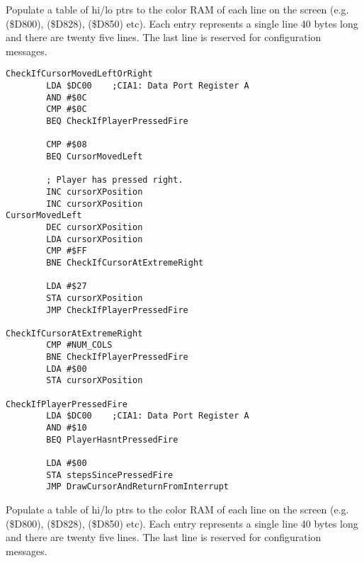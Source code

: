 Populate a table of hi/lo ptrs to the color RAM
of each line on the screen (e.g. \icode(\$D800), \icode(\$D828), \icode(\$D850) etc). Each entry represents a single
line 40 bytes long and there are twenty five lines.
The last line is reserved for configuration messages.



\clearpage
\begin{lstlisting}
CheckIfCursorMovedLeftOrRight   
        LDA $DC00    ;CIA1: Data Port Register A
        AND #$0C
        CMP #$0C
        BEQ CheckIfPlayerPressedFire

        CMP #$08
        BEQ CursorMovedLeft

        ; Player has pressed right.
        INC cursorXPosition
        INC cursorXPosition
CursorMovedLeft   
        DEC cursorXPosition
        LDA cursorXPosition
        CMP #$FF
        BNE CheckIfCursorAtExtremeRight

        LDA #$27
        STA cursorXPosition
        JMP CheckIfPlayerPressedFire

CheckIfCursorAtExtremeRight   
        CMP #NUM_COLS
        BNE CheckIfPlayerPressedFire
        LDA #$00
        STA cursorXPosition

CheckIfPlayerPressedFire   
        LDA $DC00    ;CIA1: Data Port Register A
        AND #$10
        BEQ PlayerHasntPressedFire

        LDA #$00
        STA stepsSincePressedFire
        JMP DrawCursorAndReturnFromInterrupt

\end{lstlisting}
\clearpage

Populate a table of hi/lo ptrs to the color RAM
of each line on the screen (e.g. \icode(\$D800), \icode(\$D828), \icode(\$D850) etc). Each entry represents a single
line 40 bytes long and there are twenty five lines.
The last line is reserved for configuration messages.


